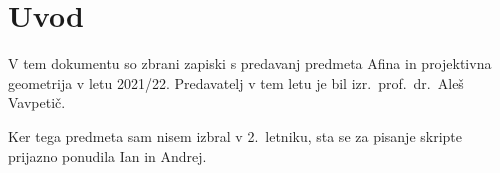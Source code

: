 \section*{Uvod}

V tem dokumentu so zbrani zapiski s predavanj predmeta Afina in
projektivna geometrija v letu 2021/22. Predavatelj v tem letu je bil
izr.~prof.~dr.~Aleš Vavpetič.

Ker tega predmeta sam nisem izbral v 2.~letniku, sta se za pisanje
skripte prijazno ponudila Ian in Andrej.
